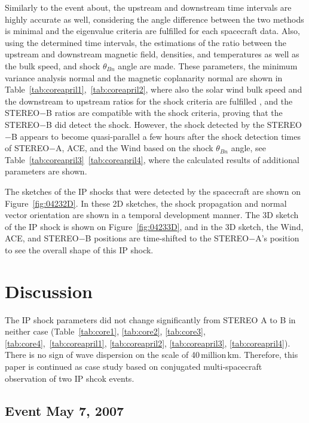 \documentclass[draft]{agujournal2019}
\begin{document}
Similarly to the event about, the upstream and downstream time intervals are highly accurate as well, considering the angle difference between the two methods is minimal and the eigenvalue criteria are fulfilled for each spacecraft data.  Also, using the determined time intervals, the estimations of the ratio between the upstream and downstream magnetic field, densities, and temperatures as well as the bulk speed, and shock $\theta_{Bn}$ angle are made. These parameters, the minimum variance analysis normal and the magnetic coplanarity normal are shown in Table~\ref{tab:coreapril1},~\ref{tab:coreapril2}, where also the solar wind bulk speed and the downstream to upstream ratios for the shock criteria are fulfilled \cite{lumme17:_datab_helios_shock_waves}, and the STEREO$-$B ratios are compatible with the shock criteria, proving that the STEREO$-$B did detect the shock. However, the shock detected by the STEREO$-$B appears to become quasi-parallel a few hours after the shock detection times of STEREO$-$A, ACE, and the Wind based on the shock $\theta_{Bn}$ angle, see Table~\ref{tab:coreapril3}~\ref{tab:coreapril4}, where the calculated results of additional parameters are shown. 

The sketches of the IP shocks that were detected by the spacecraft are shown on Figure~\ref{fig:04232D}. In these 2D sketches, the shock propagation and normal vector orientation are shown in a temporal development manner.  The 3D sketch of the IP shock is shown on Figure~\ref{fig:04233D}, and in the 3D sketch, the Wind, ACE, and STEREO$-$B positions are time-shifted to the STEREO$-$A's position to see the overall shape of this IP shock.

\section{Discussion}
\label{sec:disc}

The IP shock parameters did not change significantly from STEREO A to B in neither case (Table~\ref{tab:core1}, \ref{tab:core2}, \ref{tab:core3}, \ref{tab:core4},~\ref{tab:coreapril1}, \ref{tab:coreapril2}, \ref{tab:coreapril3}, \ref{tab:coreapril4}). There is no sign of wave dispersion on the scale of 40\,million\,km. Therefore, this paper is continued as case study based on conjugated multi-spacecraft observation of two IP shcok events.  

\subsection{Event May 7, 2007}
\label{sec:disc20070507}
\end{document}
